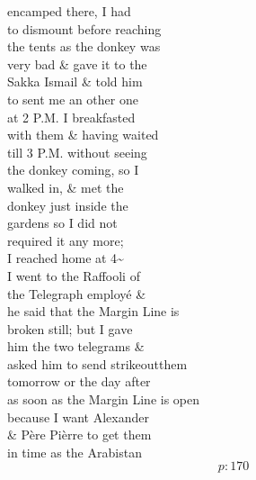 \documentclass{report}
\begin{document}




	\par{
 	encamped there, I had\ \\to dismount before reaching\ \\the tents as the donkey was\ \\very bad \& gave it to the\ \\Sakka Ismail \& told him\ \\to sent me an other one\ \\at 2 P.M. I breakfasted\ \\with them \& having waited\ \\till 3 P.M. without seeing\ \\the donkey coming, so I\ \\walked in, \& met the\ \\donkey just inside the\ \\gardens so I did not\ \\required it any more;\ \\I reached home at 4\~{}\ \\I went to the Raffooli of\ \\the Telegraph employé \&\ \\he said that the Margin Line is\ \\broken still; but I gave\ \\him the two telegrams \&\ \\asked him to send \lbrack strikeout\rbrack them\ \\tomorrow or the day after\ \\as soon as the Margin Line is open\ \\because I want Alexander\ \\\& Père Pièrre to get them\ \\in time as the Arabistan\ \\
  \[p: 170 \]

	}




\end{document}
